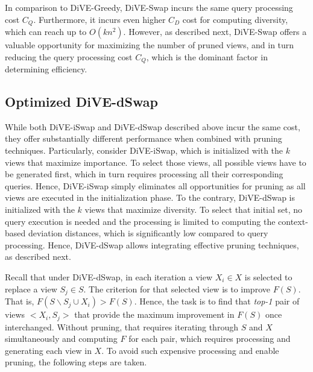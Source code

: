 In comparison to DiVE-Greedy, DiVE-Swap incurs the same query processing cost $C_Q$. 
%
Furthermore, it incurs even higher $C_D$ cost for computing diversity, which can reach up to $ O\left(kn^2 \right) $. 
%
However, as described next, DiVE-Swap offers a valuable opportunity for maximizing the number of pruned views, and in turn reducing the query processing cost $C_Q$, which is the dominant factor in determining  efficiency.   



\subsection{Optimized DiVE-dSwap}
\label{subsec:dive-dswap}

While both DiVE-iSwap and DiVE-dSwap described above incur the same cost, they offer substantially different performance when combined with pruning techniques. 
%
Particularly, consider DiVE-iSwap, which is initialized with the $k$ views that maximize importance. 
%
To select those views, all possible views have to be generated first, which in turn requires processing all their corresponding queries. 
%
Hence, DiVE-iSwap simply eliminates all opportunities for pruning as all views are executed in the initialization phase. 
%
To the contrary, DiVE-dSwap is initialized with the $k$ views that maximize diversity.
%
To select that initial set, no query execution is needed and the processing is limited to computing the context-based deviation distances, which is significantly low compared to query processing. 
%
Hence, DiVE-dSwap allows integrating effective pruning techniques, as described next. 

Recall that under DiVE-dSwap, in each iteration a view $X_i \in X$ is selected to replace a view $S_j \in S$. 
%
The criterion for that selected view is to improve $F\left(S\right)$. 
%
That is, $F(S \backslash S_j \cup X_i) >  F(S)$. 
%
Hence, the task is to find that {\em top-1} pair of views $<X_i, S_j>$ that provide the maximum improvement in $F\left(S\right)$ once interchanged. 
%
Without pruning, that requires iterating through $S$ and $X$ simultaneously and computing $F$ for each pair, which requires processing and generating each view in $X$. 
%
To avoid such expensive processing and enable pruning, the following steps are taken. 
%

